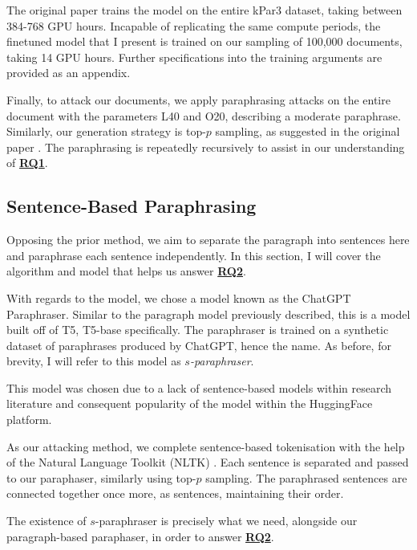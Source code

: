 \documentclass{l4proj}
\theoremstyle{definition}
\newcommand{\codefont}[1]{{\fontfamily{qcr}\selectfont #1}}
\begin{document}
        The original paper trains the model on the entire kPar3 dataset, taking between 384-768 GPU hours. Incapable of replicating the same compute periods, the finetuned model that I present is trained on our sampling of 100,000 documents, taking 14 GPU hours. Further specifications into the training arguments are provided as an appendix. 

        Finally, to attack our documents, we apply paraphrasing attacks on the entire document with the parameters L40 and O20, describing a moderate paraphrase. Similarly, our generation strategy is top-$p$ sampling, as suggested in the original paper \citep{krishna2023paraphrasing}. The paraphrasing is repeatedly recursively to assist in our understanding of \hyperref[sec:research-questions]{\textbf{RQ1}}.

        
    \subsection{Sentence-Based Paraphrasing}
        Opposing the prior method, we aim to separate the paragraph into sentences here and paraphrase each sentence independently. In this section, I will cover the algorithm and model that helps us answer \hyperref[sec:research-questions]{\textbf{RQ2}}.

        With regards to the model, we chose a model known as the \codefont{ChatGPT Paraphraser}\citep{chatgpt_paraphraser}. Similar to the paragraph model previously described, this is a model built off of T5, \codefont{T5-base} specifically. The paraphraser is trained on a synthetic dataset of paraphrases produced by ChatGPT, hence the name. As before, for brevity, I will refer to this model as \emph{$s$-paraphraser}.

        This model was chosen due to a lack of sentence-based models within research literature and consequent popularity of the model within the HuggingFace platform.

        As our attacking method, we complete sentence-based tokenisation with the help of the Natural Language Toolkit (NLTK) \citep{bird2009natural}. Each sentence is separated and passed to our paraphaser, similarly using top-$p$ sampling. The paraphrased sentences are connected together once more, as sentences, maintaining their order.

        The existence of $s$-paraphraser is precisely what we need, alongside our paragraph-based paraphaser, in order to answer \hyperref[sec:research-questions]{\textbf{RQ2}}.
    
\end{document}
